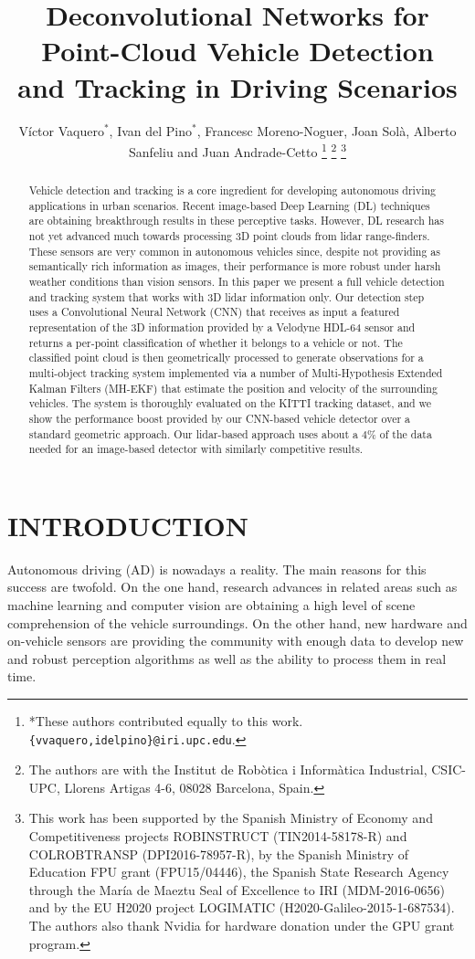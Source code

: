 \documentclass[letterpaper, 10 pt, conference]{ieeeconf}  %
\title{\LARGE \bf
Deconvolutional Networks for Point-Cloud Vehicle Detection\\
and Tracking in Driving Scenarios 
}
\author{V\'ictor Vaquero$^*$, Ivan del Pino$^*$, Francesc Moreno-Noguer, Joan Sol\`a, Alberto Sanfeliu and Juan Andrade-Cetto%
\thanks{*These authors contributed equally to this work. {\tt \small \{vvaquero,idelpino\}@iri.upc.edu}.}%
\thanks{The authors are with the Institut de Rob\`otica i Inform\`atica
Industrial, CSIC-UPC, Llorens Artigas 4-6, 08028 Barcelona, Spain.}%
\thanks{This work has been supported by the 
Spanish Ministry of Economy and Competitiveness projects ROBINSTRUCT (TIN2014-58178-R) and COLROBTRANSP (DPI2016-78957-R), 
by the Spanish Ministry of Education FPU grant (FPU15/04446), 
the Spanish State Research Agency through the Mar\'ia de Maeztu Seal of Excellence to IRI (MDM-2016-0656) 
and by the EU H2020 project LOGIMATIC (H2020-Galileo-2015-1-687534).
The authors also thank Nvidia for hardware donation under the GPU grant program.}%
}
\begin{document}
\maketitle
\thispagestyle{empty}
\pagestyle{empty}


\begin{abstract}
Vehicle detection and tracking is a core ingredient for developing autonomous driving applications in urban scenarios. Recent image-based Deep Learning (DL) techniques are obtaining breakthrough results in these perceptive tasks. 
However, DL research has not yet advanced much towards processing 3D point clouds from lidar range-finders. These sensors are very common in autonomous vehicles since, despite not providing as semantically rich information as images, their performance is more robust under harsh weather conditions than vision sensors. 
In this paper we present a full vehicle detection and tracking system that works with 3D lidar information only. 
Our detection step uses a Convolutional Neural Network (CNN) that receives as input a featured representation of the 3D information provided by a Velodyne HDL-64 sensor and returns a per-point classification of whether it belongs to a vehicle or not. 
The classified point cloud is then geometrically processed to generate observations for a multi-object tracking system implemented via a number of Multi-Hypothesis Extended Kalman Filters (MH-EKF) that estimate the position and velocity of the surrounding vehicles. 
The system is thoroughly evaluated on the KITTI tracking dataset, and we show the performance boost provided by our CNN-based vehicle detector over a standard geometric approach. Our lidar-based approach uses about a $4\%$ of the data needed for an image-based detector with similarly competitive results.
\end{abstract}


\section{INTRODUCTION}%
Autonomous driving (AD) is nowadays a reality. The main reasons for  this success are twofold. On the one hand, research advances in related areas such as machine learning and computer vision are obtaining a high level of scene comprehension of the vehicle surroundings. 
On the other hand, new hardware and on-vehicle sensors are providing the community with enough data to develop new and robust perception algorithms as well as the ability to process them in real time. 
\end{document}
